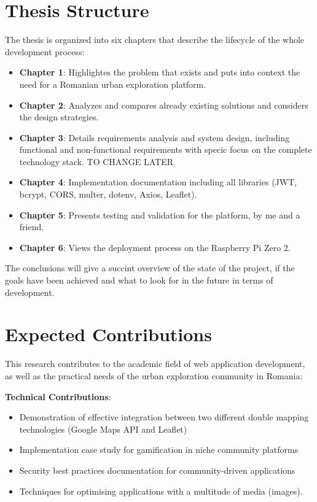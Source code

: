 \documentclass[12pt,a4paper]{report}
\begin{document}
\section*{Thesis Structure}

The thesis is organized into six chapters that describe the lifecycle of the whole development process:

\begin{itemize}
    \item \textbf{Chapter 1}: Highlightes the problem that exists and puts into context the need for a Romanian urban exploration platform.
    
    \item \textbf{Chapter 2}: Analyzes and compares already existing solutions and considers the design strategies.
    
    \item \textbf{Chapter 3}: Details requirements analysis and system design, including functional
and non-functional requirements with specic focus on the complete technology
stack. TO CHANGE LATER
    
    \item \textbf{Chapter 4}: Implementation documentation including all libraries (JWT, bcrypt, CORS, multer, dotenv, Axios, Leaflet).
    
    \item \textbf{Chapter 5}: Presents testing and validation for the platform, by me and a friend.
    
    \item \textbf{Chapter 6}: Views the deployment process on the Raspberry Pi Zero 2.
\end{itemize}

The conclusions will give a succint overview of the state of the project, if the goals have been achieved and what to look for in the future in terms of development.

\section*{Expected Contributions}

This research contributes to the academic field of web application development, as well as the practical needs of the urban exploration community in Romania:

\textbf{Technical Contributions}:
\begin{itemize}
    \item Demonstration of effective integration between two different double mapping technologies (Google Maps API and Leaflet)
    \item Implementation case study for gamification in niche community platforms
    \item Security best practices documentation for community-driven applications
    \item Techniques for optimising applications with a multitude of media (images).
\end{itemize}
\end{document}
